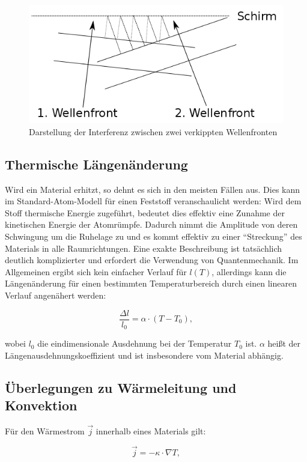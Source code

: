 \begin{figure}
\centering
        \includegraphics[width=.9\textwidth]{images/verkippung.png}
\caption{Darstellung der Interferenz zwischen zwei verkippten Wellenfronten}
\label{verkippung}
\end{figure}


\subsection{Thermische Längenänderung}
Wird ein Material erhitzt, so dehnt es sich in den meisten Fällen aus. Dies kann im Standard-Atom-Modell für einen Feststoff veranschaulicht werden: Wird dem Stoff thermische Energie zugeführt, bedeutet dies effektiv eine Zunahme der kinetischen Energie der Atomrümpfe. Dadurch nimmt die Amplitude von deren Schwingung um die Ruhelage zu und es kommt effektiv zu einer \enquote{Streckung} des Materials in alle Raumrichtungen. Eine exakte Beschreibung ist tatsächlich deutlich komplizierter und erfordert die Verwendung von Quantenmechanik. Im Allgemeinen ergibt sich kein einfacher Verlauf für $ l(T) $, allerdings kann die Längenänderung für einen bestimmten Temperaturbereich durch einen linearen Verlauf angenähert werden: 

\begin{equation}
\frac{ \Delta l}{l_{0}} = \alpha \cdot (T-T_{0}), 
\end{equation}

wobei $ l_{0} $ die eindimensionale Ausdehnung bei der Temperatur $ T_{0} $ ist. $ \alpha $ heißt der Längenausdehnungskoeffizient und ist insbesondere vom Material abhängig. 

\subsection{Überlegungen zu Wärmeleitung und Konvektion}
Für den Wärmestrom $ \vec{j} $ innerhalb eines Materials gilt: 

\begin{equation}
\vec{j} = - \kappa \cdot \nabla T, 
\label{form:j}
\end{equation}

